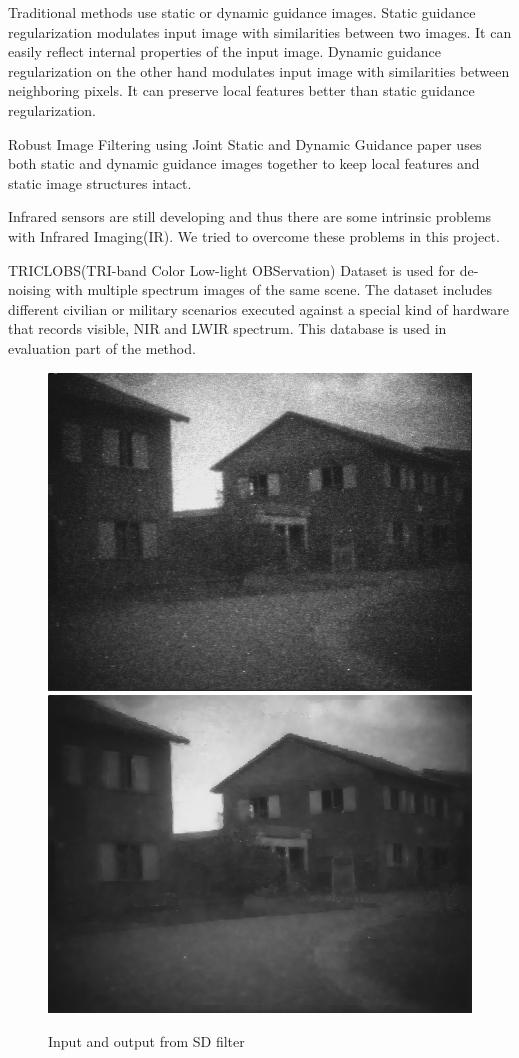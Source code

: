 \documentclass[10pt,twocolumn,letterpaper]{article}
\begin{document}
Traditional methods use static or dynamic guidance images. Static guidance regularization modulates input image with similarities between two images. It can easily reflect internal properties of the input image.
Dynamic guidance regularization on the other hand modulates input image with similarities between neighboring pixels. It can preserve local features better than static guidance regularization.

Robust Image Filtering using Joint Static and Dynamic Guidance\cite{ham2015robust} paper uses both static and dynamic guidance images together to keep local features and static image structures intact.

Infrared sensors are still developing and thus there are some intrinsic problems with Infrared Imaging(IR). We tried to overcome these problems in this project.

TRICLOBS(TRI-band Color Low-light OBServation) Dataset\cite{triclobs} is used for de-noising with multiple spectrum images of the same scene. The dataset includes different civilian or military scenarios executed against a special kind of hardware that records visible, NIR and LWIR spectrum. This database is used in evaluation part of the method\cite{ham2015robust}.

\begin{figure}
	\includegraphics[width=0.49\columnwidth]{images/TRI_A4/ch1.png}
	\includegraphics[width=0.49\columnwidth]{images/TRI_A4/ch1_ch3_15_3000_150.png}
	\caption{Input and output from SD filter}\label{fig:example-input-output}
\end{figure}
\end{document}
